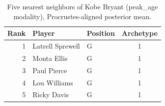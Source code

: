 \begin{table}[htbp]
  \centering\small
  \begin{tabular}{rllc}
    \toprule
    Rank & Player & Position & Archetype \\
    \midrule
    1 & Latrell Sprewell & G & 1 \\
    2 & Monta Ellis & G & 1 \\
    3 & Paul Pierce & G & 1 \\
    4 & Lou Williams & G & 1 \\
    5 & Ricky Davis & G & 1 \\
    \bottomrule
  \end{tabular}
  \caption{Five nearest neighbors of Kobe Bryant (peak_age modality), Procrustes-aligned posterior mean.}
  \label{tab:Kobe_Bryant_neighbors_peak_age}
\end{table}

